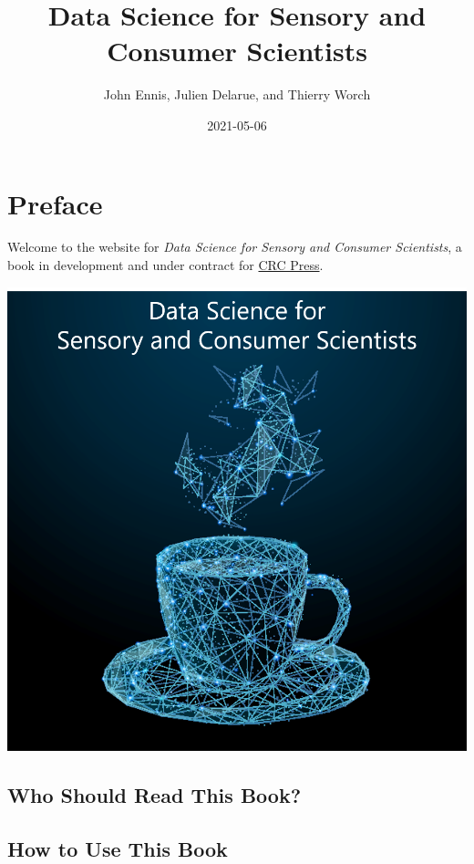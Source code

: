 \documentclass[
]{book}
\title{Data Science for Sensory and Consumer Scientists}
\author{John Ennis, Julien Delarue, and Thierry Worch}
\date{2021-05-06}
\begin{document}
\maketitle

{
\setcounter{tocdepth}{1}
\tableofcontents
}
\hypertarget{preface}{%
\chapter*{Preface}\label{preface}}

Welcome to the website for \emph{Data Science for Sensory and Consumer Scientists}, a book in development and under contract for \href{https://www.routledge.com/}{CRC Press}.

\begin{center}\includegraphics[width=13.44in]{images/cover_art} \end{center}

\hypertarget{who-should-read-this-book}{%
\section*{Who Should Read This Book?}\label{who-should-read-this-book}}

\hypertarget{how-to-use-this-book}{%
\section*{How to Use This Book}\label{how-to-use-this-book}}
\end{document}
